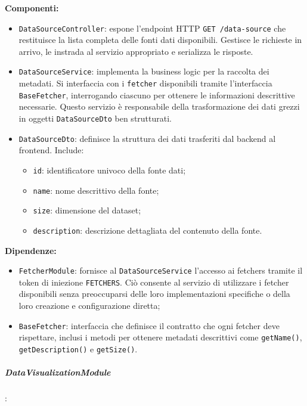 \textbf{Componenti:}
\begin{itemize}
    \item \texttt{DataSourceController}: espone l'endpoint HTTP \texttt{GET /data-source} che restituisce la lista completa delle fonti dati disponibili. Gestisce le richieste in arrivo, le instrada al servizio appropriato e serializza le risposte.
    
    \item \texttt{DataSourceService}: implementa la business logic per la raccolta dei metadati. Si interfaccia con i \texttt{fetcher} disponibili tramite l'interfaccia \texttt{BaseFetcher}, interrogando ciascuno per ottenere le informazioni descrittive necessarie. Questo servizio è responsabile della trasformazione dei dati grezzi in oggetti \texttt{DataSourceDto} ben strutturati.
    
    \item \texttt{DataSourceDto}: definisce la struttura dei dati trasferiti dal backend al frontend. Include:
    \begin{itemize}
        \item \texttt{id}: identificatore univoco della fonte dati;
        \item \texttt{name}: nome descrittivo della fonte;
        \item \texttt{size}: dimensione del dataset;
        \item \texttt{description}: descrizione dettagliata del contenuto della fonte.
    \end{itemize}
\end{itemize}

\textbf{Dipendenze:}
\begin{itemize}
    \item \texttt{FetcherModule}: fornisce al \texttt{DataSourceService} l'accesso ai fetchers tramite il token di iniezione \texttt{FETCHERS}. Ciò consente al servizio di utilizzare i fetcher disponibili senza preoccuparsi delle loro implementazioni specifiche o della loro creazione e configurazione diretta;
    \item \texttt{BaseFetcher}: interfaccia che definisce il contratto che ogni fetcher deve rispettare, inclusi i metodi per ottenere metadati descrittivi come \texttt{getName()}, \texttt{getDescription()} e \texttt{getSize()}.
\end{itemize}

\subparagraph{DataVisualizationModule}:

